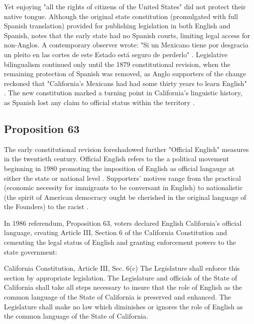 Yet enjoying "all the rights of citizens of the United States" did not protect
their native tongue. Although the original state constitution (promulgated with
full Spanish translation) provided for publishing legislation in both English
and Spanish, \textcite{lamar-prieto14} notes that the early state had no Spanish
courts, limiting legal access for non-Anglos. A contemporary observer wrote: "Si
un Mexicano tiene por desgracia un pleito en las cortes de este Estado está
seguro de perderlo" \parencite[28]{lamar-prieto14}. Legislative bilingualism
continued only until the 1879 constitutional revision, when the remaining
protection of Spanish was removed, as Anglo supporters of the change reckoned
that "California's Mexicans had had some thirty years to learn English"
\parencite{baron92}. The new constitution marked a turning point in California's
linguistic history, as Spanish lost any claim to official status within the
territory \parencite{baron92}.

\subsection{Proposition 63}

The early constitutional revision foreshadowed further "Official English"
measures in the twentieth century. Official English refers to the a political
movement beginning in 1980 promoting the imposition of English as official
langauge at either the state or national level \parencite{liu14}. Supporters' motives
range from the practical (economic necessity for immigrants to be conversant in
English) to nationalistic (the spirit of American democracy ought be cherished
in the original language of the Founders) to the racist \parencite[7]{baron92}.

In 1986 referendum, Proposition 63, voters declared English California's
official language, creating Article III, Section 6 of the California
Constitution and cementing the legal status of English and granting enforcement
powers to the state government: 

\begin{aquote}{California Constitution, Article III, Sec. 6(c)}
	The Legislature shall enforce this section by appropriate legislation. The
	Legislature and officials of the State of California shall take all steps
	necessary to insure that the role of English as the common language of the
	State of California is preserved and enhanced. The Legislature shall make no
	law which diminishes or ignores the role of English as the common language of
	the State of California. \parencite{ca-const}
\end{aquote}

